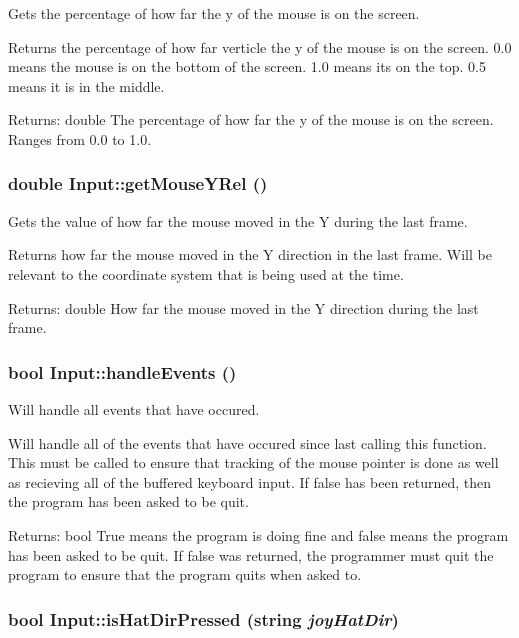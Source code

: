 Gets the percentage of how far the y of the mouse is on the screen. 

Returns the percentage of how far verticle the y of the mouse is on the screen. 0.0 means the mouse is on the bottom of the screen. 1.0 means its on the top. 0.5 means it is in the middle. \begin{Desc}
\item[Returns:]double The percentage of how far the y of the mouse is on the screen. Ranges from 0.0 to 1.0. \end{Desc}
\hypertarget{class_input_9e6dc2cf7d8e68b491fd1b5b243f8ffb}{
\subsubsection[{getMouseYRel}]{\setlength{\rightskip}{0pt plus 5cm}double Input::getMouseYRel ()}}
\label{class_input_9e6dc2cf7d8e68b491fd1b5b243f8ffb}


Gets the value of how far the mouse moved in the Y during the last frame. 

Returns how far the mouse moved in the Y direction in the last frame. Will be relevant to the coordinate system that is being used at the time. \begin{Desc}
\item[Returns:]double How far the mouse moved in the Y direction during the last frame. \end{Desc}
\hypertarget{class_input_1567bc0d8b690e342e1adbd59916b775}{
\subsubsection[{handleEvents}]{\setlength{\rightskip}{0pt plus 5cm}bool Input::handleEvents ()}}
\label{class_input_1567bc0d8b690e342e1adbd59916b775}


Will handle all events that have occured. 

Will handle all of the events that have occured since last calling this function. This must be called to ensure that tracking of the mouse pointer is done as well as recieving all of the buffered keyboard input. If false has been returned, then the program has been asked to be quit. \begin{Desc}
\item[Returns:]bool True means the program is doing fine and false means the program has been asked to be quit. If false was returned, the programmer must quit the program to ensure that the program quits when asked to. \end{Desc}
\hypertarget{class_input_c4b16d6f64e089b08c6b680bbb354d89}{
\subsubsection[{isHatDirPressed}]{\setlength{\rightskip}{0pt plus 5cm}bool Input::isHatDirPressed (string {\em joyHatDir})}}
\label{class_input_c4b16d6f64e089b08c6b680bbb354d89}


